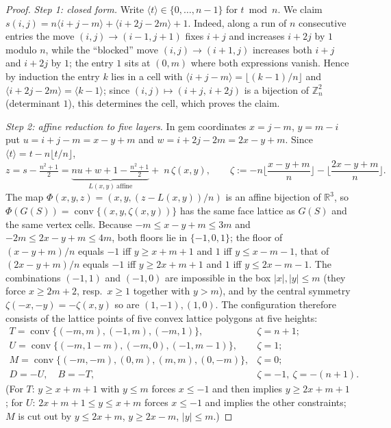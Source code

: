 \begin{proof}
\emph{Step 1: closed form.}  Write $\langle t\rangle\in\{0,\dots,n-1\}$ for
$t\bmod n$.  We claim $s(i,j)=n\langle i+j-m\rangle+\langle i+2j-2m\rangle+1$.
Indeed, along a run of $n$ consecutive entries the move $(i,j)\to(i-1,j+1)$
fixes $i+j$ and increases $i+2j$ by $1$ modulo $n$, while the ``blocked''
move $(i,j)\to(i+1,j)$ increases both $i+j$ and $i+2j$ by $1$; the entry $1$
sits at $(0,m)$ where both expressions vanish.  Hence by induction the entry
$k$ lies in a cell with $\langle i+j-m\rangle=\lfloor (k-1)/n\rfloor$ and
$\langle i+2j-2m\rangle=\langle k-1\rangle$; since
$(i,j)\mapsto(i+j,\,i+2j)$ is a bijection of $\mathbb Z_n^2$ (determinant
$1$), this determines the cell, which proves the claim.

\emph{Step 2: affine reduction to five layers.}  In gem coordinates
$x=j-m$, $y=m-i$ put $u=i+j-m=x-y+m$ and $w=i+2j-2m=2x-y+m$.  Since
$\langle t\rangle=t-n\lfloor t/n\rfloor$,
\[
z=s-\tfrac{n^2+1}{2}=\underbrace{nu+w+1-\tfrac{n^2+1}{2}}_{L(x,y)\ \text{affine}}
+\;n\,\zeta(x,y),\qquad
\zeta:=-n\Big\lfloor\frac{x-y+m}{n}\Big\rfloor-\Big\lfloor\frac{2x-y+m}{n}\Big\rfloor .
\]
The map $\Phi(x,y,z)=(x,y,(z-L(x,y))/n)$ is an affine bijection of
$\mathbb R^3$, so $\Phi(G(S))=\operatorname{conv}\{(x,y,\zeta(x,y))\}$ has the
same face lattice as $G(S)$ and the same vertex cells.  Because
$-m\le x-y+m\le 3m$ and $-2m\le 2x-y+m\le 4m$, both floors lie in
$\{-1,0,1\}$; the floor of $(x-y+m)/n$ equals $-1$ iff $y\ge x+m+1$ and
$1$ iff $y\le x-m-1$, that of $(2x-y+m)/n$ equals $-1$ iff $y\ge 2x+m+1$ and
$1$ iff $y\le 2x-m-1$.  The combinations $(-1,1)$ and $(-1,0)$ are impossible
in the box $|x|,|y|\le m$ (they force $x\ge 2m+2$, resp.\ $x\ge1$ together
with $y>m$), and by the central symmetry $\zeta(-x,-y)=-\zeta(x,y)$ so are
$(1,-1),(1,0)$.  The configuration therefore consists of the lattice points of
five convex lattice polygons at five heights:
\[
\begin{array}{ll}
T=\operatorname{conv}\{(-m,m),(-1,m),(-m,1)\}, & \zeta=n+1;\\
U=\operatorname{conv}\{(-m,1-m),(-m,0),(-1,m-1)\}, & \zeta=1;\\
M=\operatorname{conv}\{(-m,-m),(0,m),(m,m),(0,-m)\}, & \zeta=0;\\
D=-U,\quad B=-T, & \zeta=-1,\ \zeta=-(n+1).
\end{array}
\]
(For $T$: $y\ge x+m+1$ with $y\le m$ forces $x\le-1$ and then implies
$y\ge 2x+m+1$; for $U$: $2x+m+1\le y\le x+m$ forces $x\le -1$ and implies the
other constraints; $M$ is cut out by $y\le 2x+m$, $y\ge 2x-m$, $|y|\le m$.)


\end{proof}
